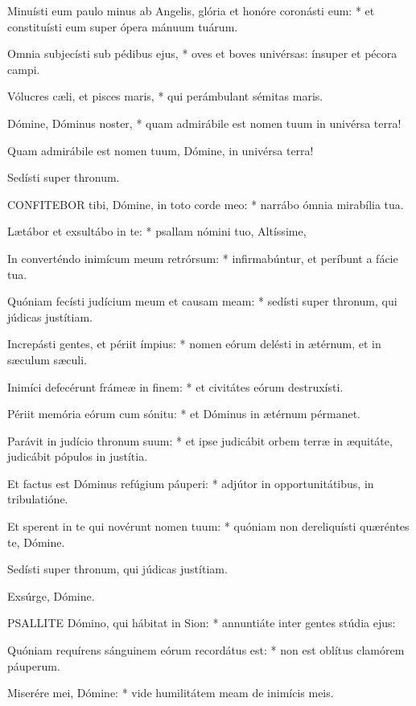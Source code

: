 Minuísti eum paulo minus ab Angelis, glória et honóre coronásti eum: * et constituísti eum super ópera mánuum tuárum.

Omnia subjecísti sub pédibus ejus, * oves et boves univérsas: ínsuper et pécora campi.

Vólucres cæli, et pisces maris, * qui perámbulant sémitas maris.

Dómine, Dóminus noster, * quam admirábile est nomen tuum in univérsa terra!

 Quam admirábile est nomen tuum, Dómine, in univérsa terra!

 Sedísti super thronum.


\lettrine[lines=2]{C}{ONFITEBOR} tibi, Dómine, in toto corde meo: * narrábo ómnia mirabília tua.

Lætábor et exsultábo in te: * psallam nómini tuo, Altíssime,

In converténdo inimícum meum retrórsum: * infirmabúntur, et períbunt a fácie tua.

Quóniam fecísti judícium meum et causam meam: * sedísti super thronum, qui júdicas justítiam.

Increpásti gentes, et périit ímpius: * nomen eórum delésti in ætérnum, et in sæculum sæculi.

Inimíci defecérunt frámeæ in finem: * et civitátes eórum destruxísti.

Périit memória eórum cum sónitu: * et Dóminus in ætérnum pérmanet.

Parávit in judício thronum suum: * et ipse judicábit orbem terræ in æquitáte, judicábit pópulos in justítia.

Et factus est Dóminus refúgium páuperi: * adjútor in opportunitátibus, in tribulatióne.

Et sperent in te qui novérunt nomen tuum: * quóniam non dereliquísti quæréntes te, Dómine.

 Sedísti super thronum, qui júdicas justítiam.

 Exsúrge, Dómine.


\lettrine[lines=2]{P}{SALLITE} Dómino, qui hábitat in Sion: * annuntiáte inter gentes stúdia ejus:

Quóniam requírens sánguinem eórum recordátus est: * non est oblítus clamórem páuperum.

Miserére mei, Dómine: * vide humilitátem meam de inimícis meis.

